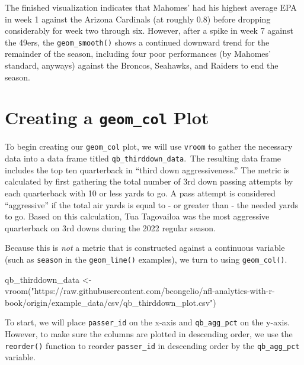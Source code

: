 \documentclass[
  letterpaper,
]{krantz}
\newenvironment{Shaded}{\begin{snugshade}}{\end{snugshade}}
\newcommand{\FunctionTok}[1]{\textcolor[rgb]{0.28,0.35,0.67}{#1}}
\newcommand{\NormalTok}[1]{\textcolor[rgb]{0.00,0.23,0.31}{#1}}
\newcommand{\OtherTok}[1]{\textcolor[rgb]{0.00,0.23,0.31}{#1}}
\newcommand{\StringTok}[1]{\textcolor[rgb]{0.13,0.47,0.30}{#1}}
\begin{document}
The finished visualization indicates that Mahomes' had his highest
average EPA in week 1 against the Arizona Cardinals (at roughly 0.8)
before dropping considerably for week two through six. However, after a
spike in week 7 against the 49ers, the \texttt{geom\_smooth()} shows a
continued downward trend for the remainder of the season, including four
poor performances (by Mahomes' standard, anyways) against the Broncos,
Seahawks, and Raiders to end the season.

\hypertarget{creating-a-geom_col-plot}{%
\section{\texorpdfstring{Creating a \texttt{geom\_col}
Plot}{Creating a geom\_col Plot}}\label{creating-a-geom_col-plot}}

To begin creating our \texttt{geom\_col} plot, we will use
\texttt{vroom} to gather the necessary data into a data frame titled
\texttt{qb\_thirddown\_data}.~The resulting data frame includes the top
ten quarterback in ``third down aggressiveness.'' The metric is
calculated by first gathering the total number of 3rd down passing
attempts by each quarterback with 10 or less yards to go. A pass attempt
is considered ``aggressive'' if the total air yards is equal to - or
greater than - the needed yards to go. Based on this calculation, Tua
Tagovailoa was the most aggressive quarterback on 3rd downs during the
2022 regular season.

Because this is \emph{not} a metric that is constructed against a
continuous variable (such as \texttt{season} in the
\texttt{geom\_line()} examples), we turn to using \texttt{geom\_col()}.

\begin{Shaded}
\begin{Highlighting}[]
\NormalTok{qb\_thirddown\_data }\OtherTok{\textless{}{-}}
  \FunctionTok{vroom}\NormalTok{(}\StringTok{"https://raw.githubusercontent.com/bcongelio/nfl{-}analytics{-}with{-}r{-}book/origin/example\_data/csv/qb\_thirddown\_plot.csv"}\NormalTok{)}
\end{Highlighting}
\end{Shaded}

To start, we will place \texttt{passer\_id} on the x-axis and
\texttt{qb\_agg\_pct} on the y-axis. However, to make sure the columns
are plotted in descending order, we use the \texttt{reorder()} function
to reorder \texttt{passer\_id} in descending order by the
\texttt{qb\_agg\_pct} variable.
\end{document}
